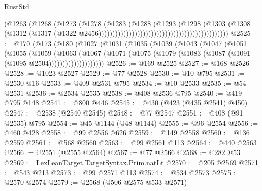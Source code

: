 \begin{lexlean}{RustStd}
\begin{coremodule}
                                                                        (@1263
                                                                          (@1268
                                                                            (@1273
                                                                              (@1278
                                                                                (@1283
                                                                                  (@1288
                                                                                    (@1293
                                                                                      (@1298
                                                                                        (@1303
                                                                                          (@1308
                                                                                            (@1312
                                                                                              (@1317
                                                                                                (@1322
                                                                                                  @2456)))))))))))))))))))))))))))))))))))))))))))))))
@2525 := @170
    (@173
      (@180
        (@1027
          (@1031
            (@1035
              (@1039
                (@1043
                  (@1047
                    (@1051
                      (@1055
                        (@1059
                          (@1063
                            (@1067
                              (@1071
                                (@1075 (@1079 (@1083 (@1087 (@1091 (@1095 @2504))))))))))))))))))))
@2526 := @169 @2525
@2527 := @168 @2526
@2528 := @1023 @2527
@2529 := @77 @2528
@2530 := @10 @795
@2531 := @2530 @16
@2533 := @409 @2531 @795
@2534 := @10 @2533
@2535 := @54 @2531
@2536 := @2534 @2535
@2538 := @408 @2536 @795
@2540 := @419 @795 @148
@2541 := @800 @446
@2545 := @430 (@423 (@435 @2541) @450)
@2547 := @2538 (@2540 @2545)
@2548 := @77 @2547
@2551 := @408 (@91 @2535) @795
@2554 := @45 @1144 (@48 @1144)
@2555 := @96 @2554
@2556 := @460 @428
@2558 := @99 @2556 @626
@2559 := @149 @2558
@2560 := @136 @2559
@2561 := @568 @2560
@2563 := @99 @2561 @113
@2564 := @440 @2563
@2566 := @2551 (@2555 @2564)
@2567 := @77 @2566
@2568 := @282 @53
@2569 := LexLeanTarget.TargetSyntax.Prim.natLt
@2570 := @205 @2569
@2571 := @543 @213
@2573 := @99 @2571 @113
@2574 := @534 @2573
@2575 := @2570 @2574
@2579 := @2568 (@506 @2575 @533 @2571)

\end{coremodule}
\end{lexlean}
